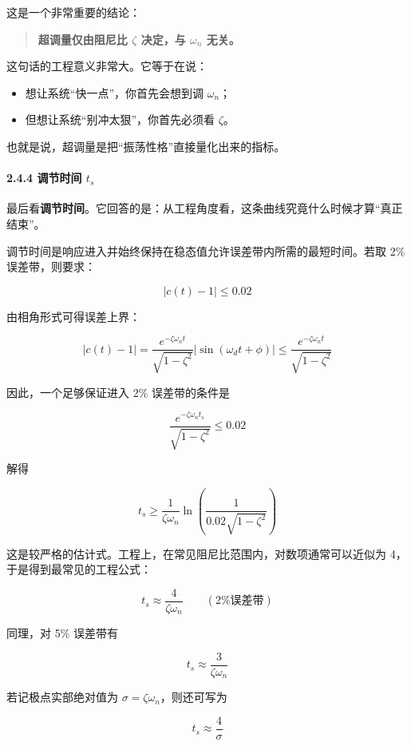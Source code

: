 \documentclass[
  11pt]{article}
\providecommand{\tightlist}{%
  \setlength{\itemsep}{0pt}\setlength{\parskip}{0pt}}
\begin{document}
这是一个非常重要的结论：

\begin{quote}
\textbf{超调量仅由阻尼比 \(\zeta\) 决定，与 \(\omega_n\) 无关。}
\end{quote}

这句话的工程意义非常大。它等于在说：

\begin{itemize}
\tightlist
\item
  想让系统``快一点''，你首先会想到调 \(\omega_n\)；
\item
  但想让系统``别冲太狠''，你首先必须看 \(\zeta\)。
\end{itemize}

也就是说，超调量是把``振荡性格''直接量化出来的指标。

\paragraph{\texorpdfstring{2.4.4 调节时间
\(t_s\)}{2.4.4 调节时间 t\_s}}\label{ux8c03ux8282ux65f6ux95f4-t_s}

最后看\textbf{调节时间}。它回答的是：从工程角度看，这条曲线究竟什么时候才算``真正结束''。

调节时间是响应进入并始终保持在稳态值允许误差带内所需的最短时间。若取 2\%
误差带，则要求：

\[
|c(t)-1| \le 0.02
\]

由相角形式可得误差上界：

\[
|c(t)-1| = \frac{e^{-\zeta\omega_n t}}{\sqrt{1-\zeta^2}}|\sin(\omega_d t + \phi)|
\le \frac{e^{-\zeta\omega_n t}}{\sqrt{1-\zeta^2}}
\]

因此，一个足够保证进入 2\% 误差带的条件是

\[
\frac{e^{-\zeta\omega_n t_s}}{\sqrt{1-\zeta^2}} \le 0.02
\]

解得

\[
t_s \ge \frac{1}{\zeta\omega_n}\ln\left(\frac{1}{0.02\sqrt{1-\zeta^2}}\right)
\]

这是较严格的估计式。工程上，在常见阻尼比范围内，对数项通常可以近似为
4，于是得到最常见的工程公式：

\[
t_s \approx \frac{4}{\zeta\omega_n} \qquad (2\%\text{误差带})
\]

同理，对 5\% 误差带有

\[
t_s \approx \frac{3}{\zeta\omega_n}
\]

若记极点实部绝对值为 \(\sigma = \zeta\omega_n\)，则还可写为

\[
t_s \approx \frac{4}{\sigma}
\]
\end{document}
